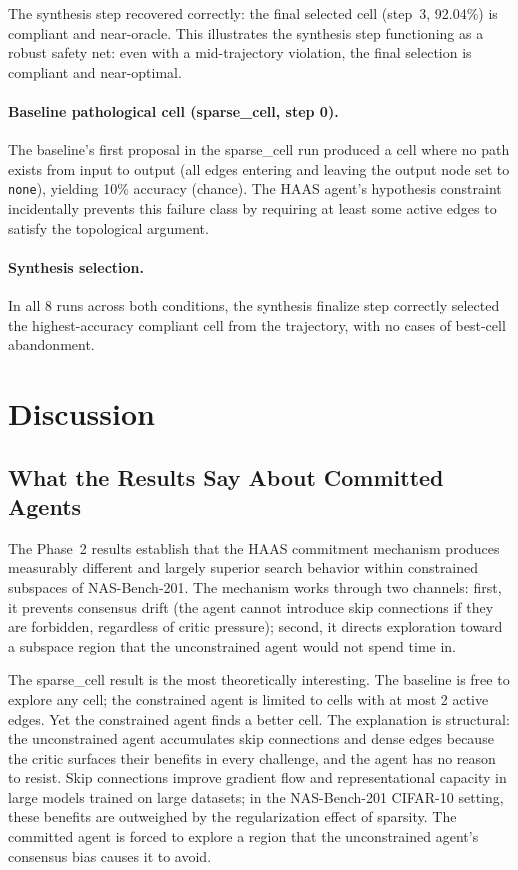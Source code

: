 \documentclass[10pt]{article}
\newcommand{\haas}{\textsc{HAAS}}
\newcommand{\nasbench}{NAS-Bench-201}
\begin{document}
The synthesis step recovered correctly: the final selected cell (step~3,
92.04\%) is compliant and near-oracle. This illustrates the synthesis step
functioning as a robust safety net: even with a mid-trajectory violation,
the final selection is compliant and near-optimal.

\paragraph{Baseline pathological cell (sparse\_cell, step 0).}
The baseline's first proposal in the sparse\_cell run produced a cell where
no path exists from input to output (all edges entering and leaving the output
node set to \texttt{none}), yielding 10\% accuracy (chance). The HAAS agent's
hypothesis constraint incidentally prevents this failure class by requiring
at least some active edges to satisfy the topological argument.

\paragraph{Synthesis selection.}
In all 8 runs across both conditions, the synthesis finalize step correctly
selected the highest-accuracy compliant cell from the trajectory, with no
cases of best-cell abandonment.

\section{Discussion}
\label{sec:discussion}

\subsection{What the Results Say About Committed Agents}

The Phase~2 results establish that the \haas{} commitment mechanism produces
measurably different and largely superior search behavior within constrained
subspaces of \nasbench{}. The mechanism works through two channels: first,
it prevents consensus drift (the agent cannot introduce skip connections if
they are forbidden, regardless of critic pressure); second, it directs
exploration toward a subspace region that the unconstrained agent would
not spend time in.

The sparse\_cell result is the most theoretically interesting. The baseline
is free to explore any cell; the constrained agent is limited to cells with
at most 2 active edges. Yet the constrained agent finds a better cell. The
explanation is structural: the unconstrained agent accumulates skip connections
and dense edges because the critic surfaces their benefits in every challenge,
and the agent has no reason to resist. Skip connections improve gradient flow
and representational capacity in large models trained on large datasets; in the
\nasbench{} CIFAR-10 setting, these benefits are outweighed by the regularization
effect of sparsity. The committed agent is forced to explore a region that the
unconstrained agent's consensus bias causes it to avoid.
\end{document}
